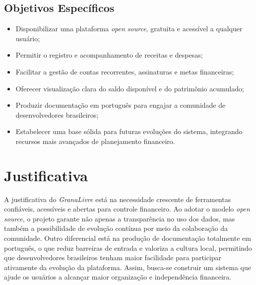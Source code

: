 \subsection{Objetivos Específicos}
\begin{itemize}
    \item Disponibilizar uma plataforma \textit{open source}, gratuita e acessível a qualquer usuário;
    \item Permitir o registro e acompanhamento de receitas e despesas;
    \item Facilitar a gestão de contas recorrentes, assinaturas e metas financeiras;
    \item Oferecer visualização clara do saldo disponível e do patrimônio acumulado;
    \item Produzir documentação em português para engajar a comunidade de desenvolvedores brasileiros;
    \item Estabelecer uma base sólida para futuras evoluções do sistema, integrando recursos mais avançados de planejamento financeiro.
\end{itemize}

\section{Justificativa}
A justificativa do \textit{GranaLivre} está na necessidade crescente de ferramentas confiáveis, acessíveis e abertas para controle financeiro. Ao adotar o modelo \textit{open source}, o projeto garante não apenas a transparência no uso dos dados, mas também a possibilidade de evolução contínua por meio da colaboração da comunidade. Outro diferencial está na produção de documentação totalmente em português, o que reduz barreiras de entrada e valoriza a cultura local, permitindo que desenvolvedores brasileiros tenham maior facilidade para participar ativamente da evolução da plataforma. Assim, busca-se construir um sistema que ajude os usuários a alcançar maior organização e independência financeira.